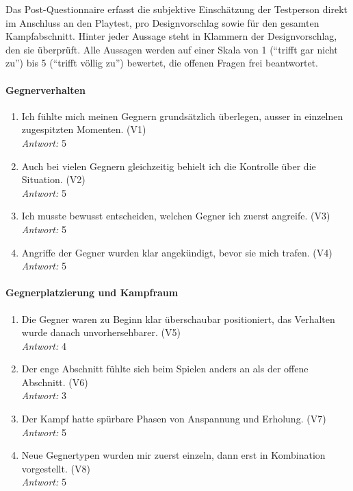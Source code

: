 \documentclass[../Main.tex]{subfiles}
\begin{document}
Das Post-Questionnaire erfasst die subjektive Einschätzung der Testperson direkt im Anschluss an den Playtest, pro Designvorschlag sowie für den gesamten Kampfabschnitt. Hinter jeder Aussage steht in Klammern der Designvorschlag, den sie überprüft. Alle Aussagen werden auf einer Skala von 1 (\enquote{trifft gar nicht zu}) bis 5 (\enquote{trifft völlig zu}) bewertet, die offenen Fragen frei beantwortet.

\paragraph{Gegnerverhalten}
\begin{enumerate}[label=\textbf{Q\arabic*}, leftmargin=1.5cm, itemsep=0.8em]
\item Ich fühlte mich meinen Gegnern grundsätzlich überlegen, ausser in einzelnen zugespitzten Momenten. \hfill (V1) \\
    \textit{Antwort:} 5
\item Auch bei vielen Gegnern gleichzeitig behielt ich die Kontrolle über die Situation. \hfill (V2) \\
    \textit{Antwort:} 5
\item Ich musste bewusst entscheiden, welchen Gegner ich zuerst angreife. \hfill (V3) \\
    \textit{Antwort:} 5
\item Angriffe der Gegner wurden klar angekündigt, bevor sie mich trafen. \hfill (V4) \\
    \textit{Antwort:} 5
\end{enumerate}

\paragraph{Gegnerplatzierung und Kampfraum}
\begin{enumerate}[label=\textbf{Q\arabic*}, leftmargin=1.5cm, itemsep=0.8em, resume]
\item Die Gegner waren zu Beginn klar überschaubar positioniert, das Verhalten wurde danach unvorhersehbarer. \hfill (V5) \\
    \textit{Antwort:} 4
\item Der enge Abschnitt fühlte sich beim Spielen anders an als der offene Abschnitt. \hfill (V6) \\
    \textit{Antwort:} 3
\item Der Kampf hatte spürbare Phasen von Anspannung und Erholung. \hfill (V7) \\
    \textit{Antwort:} 5
\item Neue Gegnertypen wurden mir zuerst einzeln, dann erst in Kombination vorgestellt. \hfill (V8) \\
    \textit{Antwort:} 5
\end{enumerate}
\end{document}
